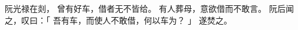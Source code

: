 
\switchcolumn*[\section{}]

阮光禄在剡，
曾有好车，借者无不皆给。
有人葬母，意欲借而不敢言。
阮后闻之，叹曰：「
    吾有车，而使人不敢借，何以车为？
」
遂焚之。

\switchcolumn



